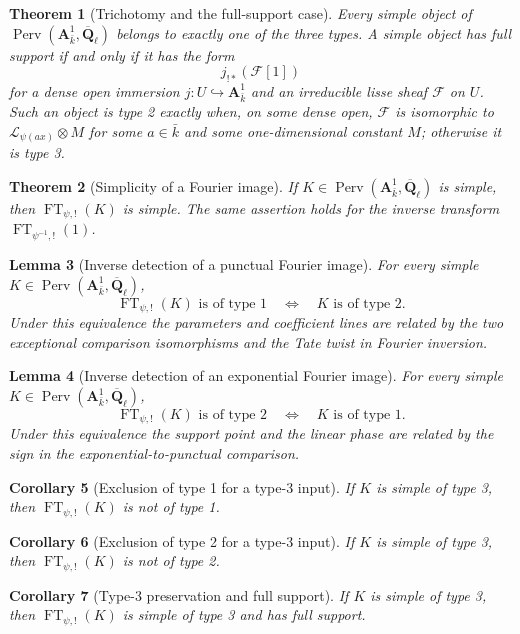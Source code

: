 \documentclass[10pt]{article}
\newtheorem{theorem}{Theorem}[section]
\newtheorem{lemma}[theorem]{Lemma}
\newtheorem{corollary}[theorem]{Corollary}
\theoremstyle{definition}
\newcommand{\Qlb}{\overline{\mathbf Q}_\ell}
\newcommand{\Aone}{\mathbf A^1}
\newcommand{\FT}{\operatorname{FT}}
\newcommand{\Perv}{\operatorname{Perv}}
\begin{document}
\begin{theorem}[Trichotomy and the full-support case]
Every simple object of \(\Perv(\Aone_{\bar k},\Qlb)\) belongs to exactly
one of the three types.  A simple object has full support if and only if it
has the form
\[
 j_{!*}(\mathcal F[1])
\]
for a dense open immersion \(j:U\hookrightarrow\Aone_{\bar k}\) and an
irreducible lisse sheaf \(\mathcal F\) on \(U\).  Such an object is type 2
exactly when, on some dense open, \(\mathcal F\) is isomorphic to
\(\mathcal L_{\psi(ax)}\otimes M\) for some \(a\in\bar k\) and some
one-dimensional constant \(M\); otherwise it is type 3.
\end{theorem}

\begin{theorem}[Simplicity of a Fourier image]
If \(K\in\Perv(\Aone_{\bar k},\Qlb)\) is simple, then
\(\FT_{\psi,!}(K)\) is simple.  The same assertion holds for the inverse
transform \(\FT_{\psi^{-1},!}(1)\).
\end{theorem}

\begin{lemma}[Inverse detection of a punctual Fourier image]
For every simple \(K\in\Perv(\Aone_{\bar k},\Qlb)\),
\[
 \FT_{\psi,!}(K)\text{ is of type 1}
 \quad\Longleftrightarrow\quad
 K\text{ is of type 2}.
\]
Under this equivalence the parameters and coefficient lines are related by
the two exceptional comparison isomorphisms and the Tate twist in Fourier
inversion.
\end{lemma}

\begin{lemma}[Inverse detection of an exponential Fourier image]
For every simple \(K\in\Perv(\Aone_{\bar k},\Qlb)\),
\[
 \FT_{\psi,!}(K)\text{ is of type 2}
 \quad\Longleftrightarrow\quad
 K\text{ is of type 1}.
\]
Under this equivalence the support point and the linear phase are related by
the sign in the exponential-to-punctual comparison.
\end{lemma}

\begin{corollary}[Exclusion of type 1 for a type-3 input]
If \(K\) is simple of type 3, then \(\FT_{\psi,!}(K)\) is not of type 1.
\end{corollary}

\begin{corollary}[Exclusion of type 2 for a type-3 input]
If \(K\) is simple of type 3, then \(\FT_{\psi,!}(K)\) is not of type 2.
\end{corollary}

\begin{corollary}[Type-3 preservation and full support]
If \(K\) is simple of type 3, then \(\FT_{\psi,!}(K)\) is simple of type 3
and has full support.
\end{corollary}
\end{document}
